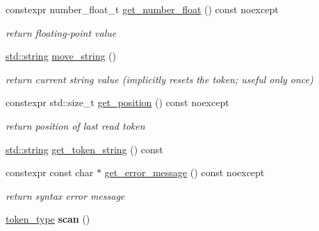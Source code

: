 \begin{DoxyCompactItemize}
constexpr number\+\_\+float\+\_\+t \hyperlink{classnlohmann_1_1detail_1_1lexer_ac013af35a21e9387993b19da5b3e0ae2}{get\+\_\+number\+\_\+float} () const noexcept
\begin{DoxyCompactList}\small\item\em return floating-\/point value \end{DoxyCompactList}\item 
\mbox{\label{classnlohmann_1_1detail_1_1lexer_a73216fe28e91a0aa3bdae77a89ce554b}} 
\hyperlink{namespacenlohmann_1_1detail_a90aa5ef615aa8305e9ea20d8a947980fab45cffe084dd3d20d928bee85e7b0f21}{std\+::string} \hyperlink{classnlohmann_1_1detail_1_1lexer_a73216fe28e91a0aa3bdae77a89ce554b}{move\+\_\+string} ()
\begin{DoxyCompactList}\small\item\em return current string value (implicitly resets the token; useful only once) \end{DoxyCompactList}\item 
\mbox{\label{classnlohmann_1_1detail_1_1lexer_a2a00465a3d5d70c84809cdb27658db79}} 
constexpr std\+::size\+\_\+t \hyperlink{classnlohmann_1_1detail_1_1lexer_a2a00465a3d5d70c84809cdb27658db79}{get\+\_\+position} () const noexcept
\begin{DoxyCompactList}\small\item\em return position of last read token \end{DoxyCompactList}\item 
\hyperlink{namespacenlohmann_1_1detail_a90aa5ef615aa8305e9ea20d8a947980fab45cffe084dd3d20d928bee85e7b0f21}{std\+::string} \hyperlink{classnlohmann_1_1detail_1_1lexer_a4aef7e72e539be04e139c34872421f2a}{get\+\_\+token\+\_\+string} () const
\item 
\mbox{\label{classnlohmann_1_1detail_1_1lexer_a53cebbc684ef97fa49651eb442d58f86}} 
constexpr const char $\ast$ \hyperlink{classnlohmann_1_1detail_1_1lexer_a53cebbc684ef97fa49651eb442d58f86}{get\+\_\+error\+\_\+message} () const noexcept
\begin{DoxyCompactList}\small\item\em return syntax error message \end{DoxyCompactList}\item 
\mbox{\label{classnlohmann_1_1detail_1_1lexer_aac3041cd2b9291e64fee38db422863c9}} 
\hyperlink{classnlohmann_1_1detail_1_1lexer_a3f313cdbe187cababfc5e06f0b69b098}{token\+\_\+type} {\bfseries scan} ()
\end{DoxyCompactItemize}
